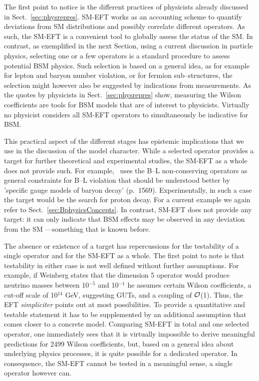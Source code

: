 The first point to notice is the different practices of physicists already discussed in
Sect.~\ref{sec:physrepres}.
SM-EFT works as an accounting scheme to quantify deviations
from SM distributions and possibly correlate different operators.
As such, the SM-EFT is a convenient tool to globally assess the status of the SM.
In contrast, as exemplified in the next Section, using a current discussion in particle physics,
selecting one or a few operators is a standard procedure to assess potential BSM physics.
Such selection is based on a general idea, as for example~\cite{Weinberg:1979sa} for lepton
and baryon number violation, or \cite{Eichten:1983hw} for fermion sub--structures, the
selection might however also be suggested by indications from measurements. 
As the quotes by physicists in Sect.~\ref{sec:physrepres} show, measuring the Wilson coefficients
are tools for BSM models that are of interest to physicists.
Virtually no physicist considers all SM-EFT operators to simultaneously be indicative for BSM. 

This practical aspect of the different stages has epistemic implications that we use in the discussion of
the model character.
While a selected operator provides a target for further theoretical and experimental studies,
the SM-EFT as a whole does not provide such.
For example,~\cite{Weinberg:1979sa} uses the B--L non-conserving operators as general
constraints for B--L violation that should be understood better by 'specific gauge models of
baryon decay' (p.~1569).
Experimentally, in such a case the target would be the search for proton decay.
For a current example we again refer to Sect.~\ref{sec:BphysicsConcepts}.
In contrast, SM-EFT does not provide any target: it can only indicate that BSM effects may be observed in any deviation from the SM
---something that is known before.


The absence or existence of a target has repercussions for the testability of a single operator and for the SM-EFT as a whole.
The first point to note is that testability in either case is not well defined without
further assumptions.
For example, if Weinberg states that the dimension 5 operator would produce neutrino masses
between 10$^{-5}$ and 10$^{-1}$ he assumes certain Wilson coefficients, a cut-off scale of 
10$^{14}$ GeV, suggesting GUTs, and a coupling of $\cal{O}$(1).
Thus, the EFT \textit{simpliciter} points out at most possibilities. 
To provide a quantitative
and testable statement it has to be supplemented by an additional assumption that comes
closer to a concrete model.
Comparing SM-EFT in total and one selected operator, one immediately sees that it is
virtually impossible to derive meaningful predictions for 2499 Wilson coefficients, but,
based on a general idea about underlying physics processes, it is quite possible for  a dedicated operator.
In consequence, the SM-EFT cannot be tested in a meaningful sense, a single operator however can. 
  
